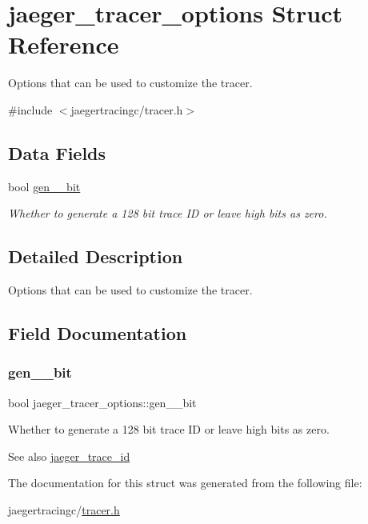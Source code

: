\hypertarget{structjaeger__tracer__options}{}\section{jaeger\+\_\+tracer\+\_\+options Struct Reference}
\label{structjaeger__tracer__options}


Options that can be used to customize the tracer.  




{\ttfamily \#include $<$jaegertracingc/tracer.\+h$>$}

\subsection*{Data Fields}
\begin{DoxyCompactItemize}
\item 
bool \mbox{\hyperlink{structjaeger__tracer__options_a32b273ee8cdf9219ef434cca6038ae9e}{gen\+\_\+\_\+bit}}
\begin{DoxyCompactList}\small\item\em Whether to generate a 128 bit trace ID or leave high bits as zero. \end{DoxyCompactList}\end{DoxyCompactItemize}


\subsection{Detailed Description}
Options that can be used to customize the tracer. 

\subsection{Field Documentation}
\mbox{\label{structjaeger__tracer__options_a32b273ee8cdf9219ef434cca6038ae9e}} 
\subsubsection{\texorpdfstring{gen\+\_\+\_\+bit}{gen\_128\_bit}}
{\footnotesize\ttfamily bool jaeger\+\_\+tracer\+\_\+options\+::gen\+\_\+\_\+bit}



Whether to generate a 128 bit trace ID or leave high bits as zero. 

\begin{DoxySeeAlso}{See also}
\mbox{\hyperlink{structjaeger__trace__id}{jaeger\+\_\+trace\+\_\+id}} 
\end{DoxySeeAlso}


The documentation for this struct was generated from the following file\+:\begin{DoxyCompactItemize}
\item 
jaegertracingc/\mbox{\hyperlink{tracer_8h}{tracer.\+h}}\end{DoxyCompactItemize}
